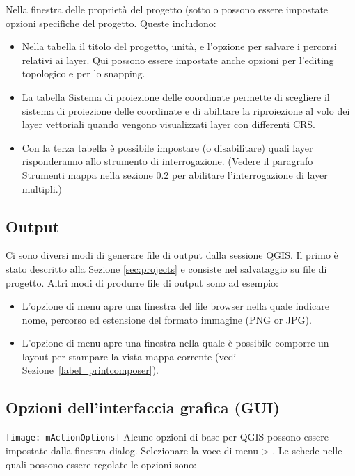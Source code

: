 Nella finestra delle proprietà del progetto (sotto  o  possono essere impostate opzioni specifiche del progetto. Queste includono:
\begin{itemize}
 \item Nella tabella  il titolo del progetto, unità, e l'opzione per salvare i percorsi relativi ai layer. Qui possono essere impostate anche opzioni per l'editing topologico e per lo snapping.
\item La tabella  Sistema di proiezione delle coordinate permette di scegliere il sistema di proiezione delle coordinate e di abilitare la riproiezione al volo dei layer vettoriali quando vengono visualizzati layer con differenti CRS.
\item Con la terza tabella  è possibile impostare (o disabilitare) quali layer risponderanno allo strumento di interrogazione. (Vedere il paragrafo Strumenti mappa nella sezione \ref{subsec:gui_options} per abilitare l'interrogazione di layer multipli.)
\end{itemize}

\subsection{Output}\label{sec:output}
Ci sono diversi modi di generare file di output dalla sessione QGIS.
Il primo è stato descritto alla Sezione \ref{sec:projects} e consiste nel
salvataggio su file di progetto. 
Altri modi di produrre file di output sono ad esempio:
\begin{itemize}
\item L'opzione di menu  apre una finestra del file browser nella quale indicare nome,
percorso ed estensione del formato immagine (PNG or JPG).
\item L'opzione di menu 
apre una finestra nella quale è possibile comporre un layout per stampare la
vista mappa corrente (vedi Sezione~\ref{label_printcomposer}).
\end{itemize}


\subsection{Opzioni dell'interfaccia grafica (GUI)}\label{subsec:gui_options}
\texttt{[image: mActionOptions]} 
Alcune opzioni di base per QGIS 
possono essere impostate dalla finestra  dialog. Selezionare la 
voce di menu  >
 . Le schede nelle quali possono
 essere regolate le opzioni sono:

